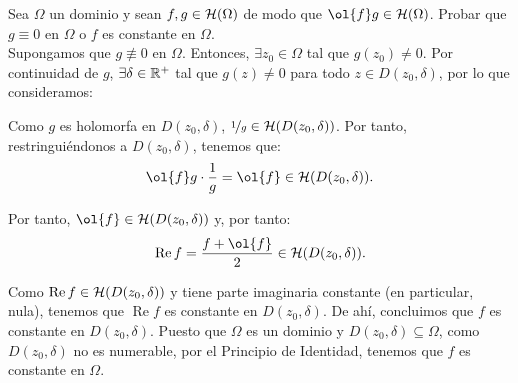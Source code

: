 \documentclass[12pt]{article}
\renewcommand{\Re}{\operatorname{Re}} %
\begin{document}
    \begin{ejercicio}[2.5 puntos]
        Sea $\Omega$ un dominio y sean $f, g \in \mathcal{H}(\Omega)$ de modo que $\ol{f}g\in \cc{H}(\Omega)$.
        Probar que $g \equiv 0$ en $\Omega$ o $f$ es constante en $\Omega$.\\

        Supongamos que $g \not\equiv 0$ en $\Omega$. Entonces, $\exists z_0 \in \Omega$ tal que $g(z_0) \neq 0$. Por continuidad de $g$, $\exists\delta\in \mathbb{R}^+$ tal que $g(z) \neq 0$ para todo $z \in D(z_0, \delta)$, por lo que consideramos:

        Como $g$ es holomorfa en $D(z_0, \delta)$, $\nicefrac{1}{g}\in \mathcal{H}(D(z_0, \delta))$. Por tanto, restringuiéndonos a $D(z_0, \delta)$, tenemos que:
        \begin{equation*}
            \ol{f}g\cdot \frac{1}{g} = \ol{f} \in \cc{H}(D(z_0, \delta)).
        \end{equation*}

        Por tanto, $\ol{f}\in \cc{H}(D(z_0, \delta))$ y, por tanto:
        \begin{equation*}
            \Re f = \dfrac{f + \ol{f}}{2} \in \cc{H}(D(z_0, \delta)).
        \end{equation*}

        Como $\Re f\in \cc{H}(D(z_0, \delta))$ y tiene parte imaginaria constante (en particular, nula), tenemos que $\Re f$ es constante en $D(z_0, \delta)$. De ahí, concluimos que $f$ es constante en $D(z_0, \delta)$. Puesto que $\Omega$ es un dominio y $D(z_0, \delta) \subseteq \Omega$, como $D(z_0, \delta)$ no es numerable, por el Principio de Identidad, tenemos que $f$ es constante en $\Omega$.


    \end{ejercicio}
\end{document}
